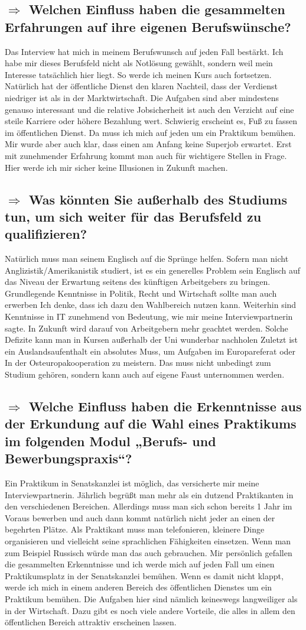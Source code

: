 \documentclass[12pt,headsepline,a4paper]{scrartcl}
\newcommand\quest[1]{\subsection*{$\Rightarrow$ #1}}
\begin{document}
\quest{Welchen Einfluss haben die gesammelten Erfahrungen auf ihre eigenen Berufswünsche?}
Das Interview hat mich in meinem Berufswunsch auf jeden Fall bestärkt. Ich habe mir dieses Berufsfeld nicht als Notlösung gewählt, sondern weil mein Interesse tatsächlich hier liegt. So werde ich meinen Kurs auch fortsetzen. Natürlich hat der öffentliche Dienst den klaren Nachteil, dass der Verdienst niedriger ist als in der  Marktwirtschaft. Die Aufgaben sind aber mindestens genauso interessant und die relative Jobsicherheit ist auch den Verzicht auf eine steile Karriere oder höhere Bezahlung wert. Schwierig erscheint es, Fuß zu fassen im öffentlichen Dienst. Da muss ich mich auf jeden um ein Praktikum bemühen.
Mir wurde aber auch klar, dass einen am Anfang keine Superjob erwartet. Erst mit zunehmender Erfahrung kommt man auch für wichtigere Stellen in Frage. Hier werde ich mir sicher keine Illusionen in Zukunft machen.

\quest{Was könnten Sie außerhalb des Studiums tun, um sich weiter für das Berufsfeld zu qualifizieren?}
Natürlich muss man seinem Englisch  auf die Sprünge helfen. Sofern man nicht Anglizistik/Amerikanistik studiert, ist es ein generelles Problem sein Englisch auf das Niveau der Erwartung seitens des künftigen Arbeitgebers zu bringen. 
Grundlegende Kenntnisse in Politik, Recht und Wirtschaft sollte man auch erwerben Ich denke, dass ich dazu den Wahlbereich nutzen kann.
Weiterhin sind Kenntnisse in IT zunehmend von Bedeutung, wie mir meine Interviewpartnerin sagte. In Zukunft wird darauf von Arbeitgebern mehr geachtet werden. Solche Defizite kann man in Kursen außerhalb der Uni wunderbar nachholen
Zuletzt ist ein Auslandsaufenthalt ein absolutes Muss, um Aufgaben im Europareferat oder In der Osteuropakooperation zu meistern. Das muss nicht unbedingt zum Studium gehören, sondern kann auch auf eigene Faust unternommen werden.

\quest{Welche Einfluss haben die Erkenntnisse aus der Erkundung auf die Wahl eines Praktikums im folgenden Modul „Berufs- und Bewerbungspraxis“?}
Ein Praktikum in Senatskanzlei ist möglich, das versicherte mir meine Interviewpartnerin. Jährlich begrüßt man mehr als ein dutzend Praktikanten in den verschiedenen Bereichen.
Allerdings muss man sich schon bereits 1 Jahr im Voraus bewerben und auch dann kommt natürlich nicht jeder an einen der begehrten Plätze. Als Praktikant muss man telefonieren, kleinere Dinge organisieren und vielleicht seine sprachlichen Fähigkeiten einsetzen. Wenn man zum Beispiel Russisch würde man das auch gebrauchen.
Mir persönlich gefallen die gesammelten Erkenntnisse und ich werde mich auf jeden Fall um einen Praktikumsplatz in der Senatskanzlei bemühen. Wenn es damit nicht klappt, werde ich mich in einem anderen Bereich des  öffentlichen Dienstes um ein Praktikum bemühen. Die Aufgaben hier sind nämlich keineswegs langweiliger als in der Wirtschaft. Dazu gibt es noch viele andere Vorteile, die alles in allem den öffentlichen  Bereich attraktiv erscheinen lassen.
\end{document}
